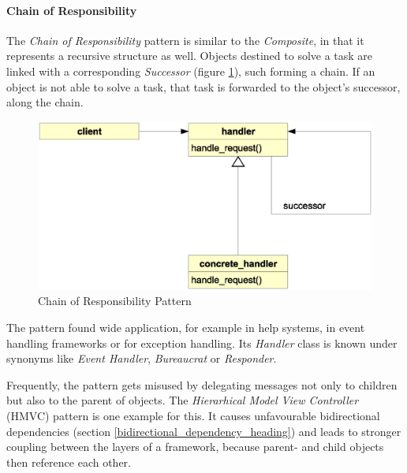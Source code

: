 %
%
%
%
%
%
%

\paragraph{Chain of Responsibility}
\label{chain_of_responsibility_heading}

The \emph{Chain of Responsibility} pattern \cite{gamma1995} is similar to the
\emph{Composite}, in that it represents a recursive structure as well. Objects
destined to solve a task are linked with a corresponding \emph{Successor}
(figure \ref{chain_figure}), such forming a chain. If an object is not able to
solve a task, that task is forwarded to the object's successor, along the chain.

\begin{figure}[ht]
    \begin{center}
        \includegraphics[scale=0.3]{vector/chain.eps}
        \caption{Chain of Responsibility Pattern}
        \label{chain_figure}
    \end{center}
\end{figure}

The pattern found wide application, for example in help systems, in event
handling frameworks or for exception handling. Its \emph{Handler} class is
known under synonyms like \emph{Event Handler}, \emph{Bureaucrat} or
\emph{Responder}.

Frequently, the pattern gets misused by delegating messages not only to children
but also to the parent of objects. The \emph{Hierarhical Model View Controller}
(HMVC) pattern is one example for this. It causes unfavourable bidirectional
dependencies (section \ref{bidirectional_dependency_heading}) and leads to
stronger coupling between the layers of a framework, because parent- and child
objects then reference each other.
